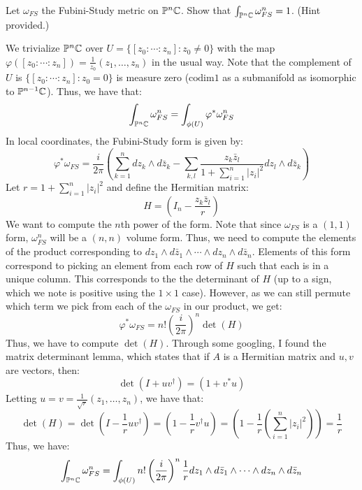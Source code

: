 \documentclass[12pt]{article}
\begin{document}
\begin{problem}{1.4}
    Let $\omega_{FS}$ the Fubini-Study metric on $\mathbb{P}^n\mathbb C$. Show that $\int_{\mathbb{P}^n\mathbb C} \omega_{FS}^n = 1$. (Hint provided.)
\end{problem}
\begin{solution}
    We trivialize $\mathbb P^n \mathbb C$ over $U = \{[z_0: \cdots : z_n] : z_0 \neq 0\}$ with the map $\varphi([z_0: \cdots : z_n]) = \frac{1}{z_0}(z_1, \ldots, z_n)$ in the usual way. Note that the complement of $U$ is $\{[z_0 : \cdots : z_n] : z_0 = 0\}$ is measure zero ($\text{codim} 1$ as a submanifold as isomorphic to $\mathbb P^{n-1} \mathbb C$). Thus, we have that: 
    \[ \int_{\mathbb P^n \mathbb C} \omega_{FS}^n = \int_{\phi(U)} \varphi^* \omega_{FS}^n\]
    In local coordinates, the Fubini-Study form is given by:
    \[ \varphi^* \omega_{FS} =\frac{i}{2\pi} \left( \sum_{k=1}^n dz_k \wedge d\bar{z}_k - \sum_{k,l} \frac{z_k\bar{z}_l}{1+\sum_{i=1}^n |z_i|^2}dz_l \wedge d\bar{z}_k\right)\]
    Let $r = 1 + \sum_{i=1}^n |z_i|^2$ and define the Hermitian matrix: 
    \[ H = \left(I_n -  \frac{z_k\bar{z}_l}{r}\right)\]
    We want to compute the $n$th power of the form. Note that since $\omega_{FS}$ is a $(1, 1)$ form, $\omega_{FS}^n$ will be a $(n, n)$ volume form. Thus, we need to compute the elements of the product corresponding to $dz_1 \wedge d\bar{z}_1 \wedge \cdots \wedge dz_n \wedge d\bar{z}_n$. \bbni
    Elements of this form correspond to picking an element from each row of $H$ such that each is in a unique column. This corresponds to the the determinant of $H$ (up to a sign, which we note is positive using the $1\times 1$ case). However, as we can still permute which term we pick from each of the $\omega_{FS}$ in our product, we get: 
    \[ \varphi^* \omega_{FS} =  n!\left(\frac{i}{2\pi}\right)^n \det(H)\]
    Thus, we have to compute $\det(H)$. Through some googling, I found the matrix determinant lemma, which states that if $A$ is a Hermitian matrix and $u, v$ are vectors, then:
    \[ \det(I + uv^\dagger) = (1 + v^*u)\]
    Letting $u = v = \frac{1}{\sqrt{r}}(z_1, \ldots, z_n)$, we have that:
    \[ \det(H) = \det\left(I - \frac{1}{r}uv^\dagger\right) = \left(1 - \frac{1}{r}v^\dagger u\right) = \left(1-\frac{1}{r}\left(\sum_{i=1}^n |z_i|^2\right)\right) = \frac{1}{r}\]
    Thus, we have: 
    \begin{align*}
        \int_{\mathbb P^n \C} \omega_{FS}^n &= \int_{\phi(U)}  n!\left(\frac{i}{2\pi}\right)^n \frac{1}{r} dz_1 \wedge d\bar{z}_1 \wedge \cdots \wedge dz_n \wedge d\bar{z}_n\\

\end{align*}
\end{solution}
\end{document}
